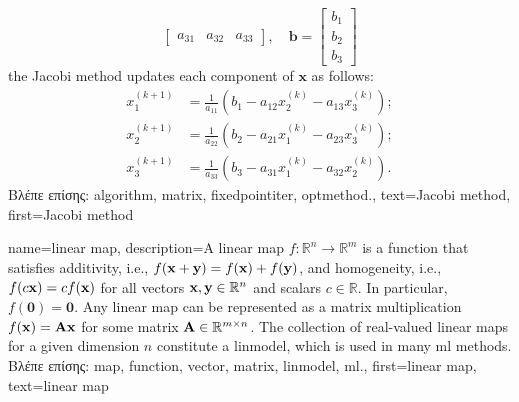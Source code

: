 {{\[\begin{bmatrix}
		 	a_{31} & a_{32} & a_{33}
		 \end{bmatrix}, \quad
		 \mathbf{b} = \begin{bmatrix}
		 	b_1 \\
		 	b_2 \\
		 	b_3
		 \end{bmatrix} 
		 \]
		 the Jacobi method updates each component of \( \mathbf{x} \) as follows:
		 \[
		 \begin{aligned}
		 	x_1^{(k+1)} &= \frac{1}{a_{11}} \left( b_1 - a_{12} x_2^{(k)} - a_{13} x_3^{(k)} \right); \\
		 	x_2^{(k+1)} &= \frac{1}{a_{22}} \left( b_2 - a_{21} x_1^{(k)} - a_{23} x_3^{(k)} \right); \\
		 	x_3^{(k+1)} &= \frac{1}{a_{33}} \left( b_3 - a_{31} x_1^{(k)} - a_{32} x_2^{(k)} \right).
		 \end{aligned}
		 \]
		\foreignlanguage{greek}{Βλέπε επίσης:} \gls{algorithm}, \gls{matrix}, \gls{fixedpointiter}, \gls{optmethod}.},
	text={Jacobi method}, 
	first={Jacobi method}
}

{name={linear map},
	description={A linear \gls{map} $f: \mathbb{R}^n \rightarrow \mathbb{R}^m$ is a \gls{function} that 
		satisfies additivity, i.e., $f({\bf x} + {\bf y}) = f({\bf x}) + f({\bf y})$, and homogeneity, i.e., 
		$f(c{\bf x}) = c f({\bf x})$ for all \gls{vector}s ${\bf x}, {\bf y} \in \mathbb{R}^n$ and scalars $c \in \mathbb{R}$. 
		In particular, $f(\mathbf{0}) = \mathbf{0}$. Any linear \gls{map} can be represented as a \gls{matrix} 
		multiplication $f({\bf x}) = {\bf A} {\bf x}$ for some \gls{matrix} ${\bf A} \in \mathbb{R}^{m \times n}$. 
		The collection of real-valued linear \gls{map}s for a given dimension $n$ constitute a \gls{linmodel}, 
		which is used in many \gls{ml} methods.\\
		\foreignlanguage{greek}{Βλέπε επίσης:} \gls{map}, \gls{function}, \gls{vector}, \gls{matrix}, \gls{linmodel}, \gls{ml}.},
	first={linear map},
	text={linear map}
}

